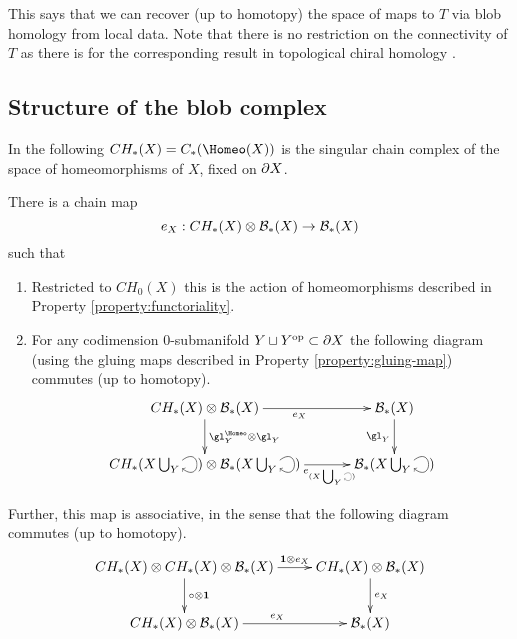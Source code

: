 \documentclass{pnastwo}
\begin{document}
\begin{article}
This says that we can recover (up to homotopy) the space of maps to $T$ via blob homology from local data. 
Note that there is no restriction on the connectivity of $T$ as there is for the corresponding result in topological chiral homology \cite[Theorem 3.8.6]{0911.0018}.


\subsection{Structure of the blob complex}
\label{sec:structure}

In the following $\CH{X} = C_*(\Homeo(X))$ is the singular chain complex of the space of homeomorphisms of $X$, fixed on $\partial X$.

\begin{thm}
\label{thm:CH}\label{thm:evaluation}
There is a chain map
\begin{equation*}
e_X: CH_*(X) \otimes {\mathcal B}_*(X) \to {\mathcal B}_*(X)
\end{equation*}
such that
\begin{enumerate}
\item Restricted to $CH_0(X)$ this is the action of homeomorphisms described in Property \ref{property:functoriality}. 

\item For
any codimension $0$-submanifold $Y \sqcup Y^\text{op} \subset \partial X$ the following diagram
(using the gluing maps described in Property \ref{property:gluing-map}) commutes (up to homotopy).
\begin{equation*}
\xymatrix@C+0.3cm{
     \CH{X} \tensor \bc_*(X)
        \ar[r]_{e_{X}}  \ar[d]^{\gl^{\Homeo}_Y \tensor \gl_Y}  &
            \bc_*(X) \ar[d]_{\gl_Y} \\
     \CH{X \bigcup_Y \selfarrow} \tensor \bc_*(X \bigcup_Y \selfarrow) \ar[r]_<<<<<<<{e_{(X \bigcup_Y \scalebox{0.5}{\selfarrow})}}    & \bc_*(X \bigcup_Y \selfarrow)
}
\end{equation*}
\end{enumerate}

Further, this map is associative, in the sense that the following diagram commutes (up to homotopy).
\begin{equation*}
\xymatrix{
\CH{X} \tensor \CH{X} \tensor \bc_*(X) \ar[r]^<<<<<{\id \tensor e_X} \ar[d]^{\compose \tensor \id} & \CH{X} \tensor \bc_*(X) \ar[d]^{e_X} \\
\CH{X} \tensor \bc_*(X) \ar[r]^{e_X} & \bc_*(X)
}
\end{equation*}
\end{thm}


\end{article}
\end{document}
